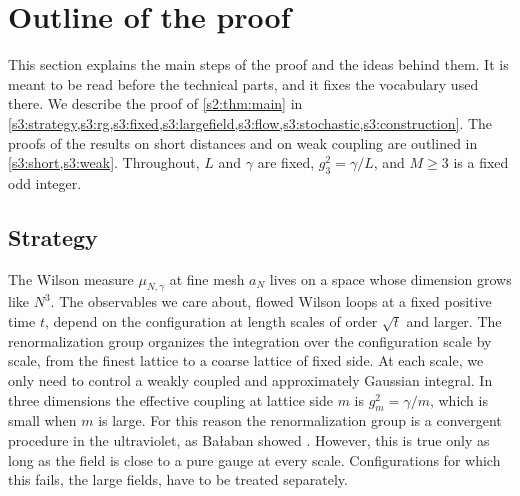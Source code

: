 \chapter{Outline of the proof}\label{s3:chapter}

This section explains the main steps of the proof and the ideas behind them. It is meant to be read before the technical parts, and it fixes the vocabulary used there. We describe the proof of \cref{s2:thm:main} in \cref{s3:strategy,s3:rg,s3:fixed,s3:largefield,s3:flow,s3:stochastic,s3:construction}. The proofs of the results on short distances and on weak coupling are outlined in \cref{s3:short,s3:weak}. Throughout, $L$ and $\gamma$ are fixed, $g_3^2=\gamma/L$, and $M\ge3$ is a fixed odd integer.

\section{Strategy}\label{s3:strategy}

The Wilson measure $\mu_{N,\gamma}$ at fine mesh $a_N$ lives on a space whose dimension grows like $N^3$. The observables we care about, flowed Wilson loops at a fixed positive time $t$, depend on the configuration at length scales of order $\sqrt t$ and larger. The renormalization group organizes the integration over the configuration scale by scale, from the finest lattice to a coarse lattice of fixed side. At each scale, we only need to control a weakly coupled and approximately Gaussian integral. In three dimensions the effective coupling at lattice side $m$ is $g_m^2=\gamma/m$, which is small when $m$ is large. For this reason the renormalization group is a convergent procedure in the ultraviolet, as Bałaban showed \cite{Balaban1985UV}. However, this is true only as long as the field is close to a pure gauge at every scale. Configurations for which this fails, the large fields, have to be treated separately.

